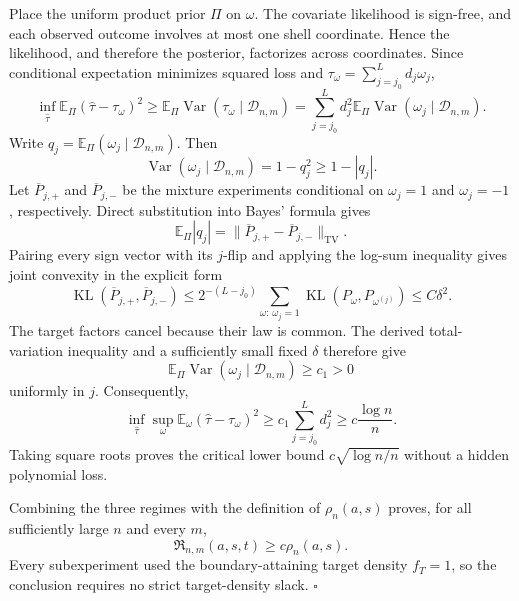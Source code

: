Place the uniform product prior \(\Pi\) on \(\omega\).  The covariate likelihood is sign-free, and each observed outcome involves at most one shell coordinate.  Hence the likelihood, and therefore the posterior, factorizes across coordinates.  Since conditional expectation minimizes squared loss and
\(\tau_\omega=\sum_{j=j_0}^Ld_j\omega_j\),
\[
 \inf_{\widehat\tau}
 \mathbb E_\Pi(\widehat\tau-\tau_\omega)^2
 \ge
 \mathbb E_\Pi\operatorname{Var}
       (\tau_\omega\mid\mathcal D_{n,m})
 =\sum_{j=j_0}^Ld_j^2
   \mathbb E_\Pi\operatorname{Var}
       (\omega_j\mid\mathcal D_{n,m}).
\]
Write \(q_j=\mathbb E_\Pi(\omega_j\mid\mathcal D_{n,m})\).  Then
\[
 \operatorname{Var}(\omega_j\mid\mathcal D_{n,m})
 =1-q_j^2\ge1-|q_j|.
\]
Let \(\overline P_{j,+}\) and \(\overline P_{j,-}\) be the mixture experiments conditional on \(\omega_j=1\) and \(\omega_j=-1\), respectively.  Direct substitution into Bayes' formula gives
\[
 \mathbb E_\Pi|q_j|
 =\lVert\overline P_{j,+}-\overline P_{j,-}\rVert_{\mathrm{TV}}.
\]
Pairing every sign vector with its \(j\)-flip and applying the log-sum inequality gives joint convexity in the explicit form
\[
 \operatorname{KL}(\overline P_{j,+},\overline P_{j,-})
 \le 2^{-(L-j_0)}
 \sum_{\omega:\,\omega_j=1}
 \operatorname{KL}(P_\omega,P_{\omega^{(j)}})
 \le C\delta^2.
\]
The target factors cancel because their law is common.  The derived total-variation inequality and a sufficiently small fixed \(\delta\) therefore give
\[
 \mathbb E_\Pi\operatorname{Var}
   (\omega_j\mid\mathcal D_{n,m})
 \ge c_1>0
\]
uniformly in \(j\).  Consequently,
\[
 \inf_{\widehat\tau}\sup_\omega
 \mathbb E_\omega(\widehat\tau-\tau_\omega)^2
 \ge c_1\sum_{j=j_0}^Ld_j^2
 \ge c\frac{\log n}{n}.
\]
Taking square roots proves the critical lower bound \(c\sqrt{\log n/n}\) without a hidden polynomial loss.

Combining the three regimes with the definition of \(\rho_n(a,s)\) proves, for all sufficiently large \(n\) and every \(m\),
\[
 \mathfrak R_{n,m}(a,s,t)\ge c\rho_n(a,s).
\]
Every subexperiment used the boundary-attaining target density \(f_T=1\), so the conclusion requires no strict target-density slack. \(\square\)